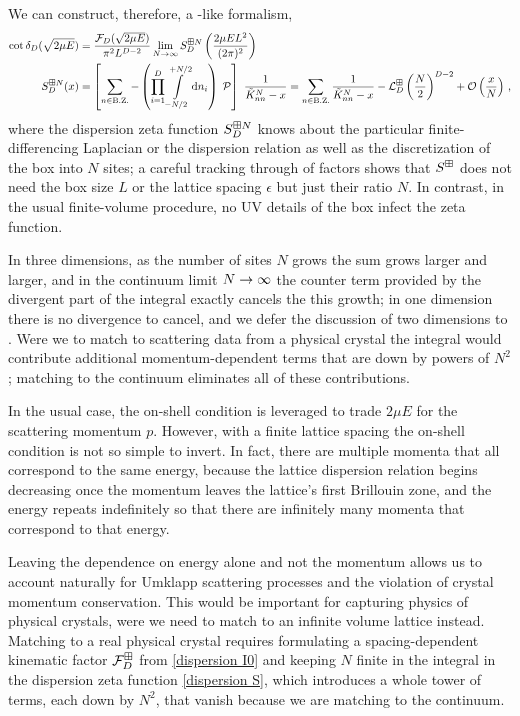 We can construct, therefore, a \Luscher-like formalism,
\begin{align}
    \label{eq:dispersion quantization}
    \cot \delta_D( \sqrt{2 \mu E} )
    &=
    \frac{\mathcal{F}_D(\sqrt{2 \mu E})}{\pi^2 L^{D-2}} \lim_{N\rightarrow\infty} S^{\boxplus N}_{D}\left(\frac{2\mu E L^2}{(2\pi)^2}\right)
    \\
    \label{eq:dispersion S}
    S^{\boxplus N}_{D}( x )
    &=
    \left[
    	\sum_{n\in\text{B.Z.}} -
		\left(\prod_{i=1}^D
    		\int\limits_{-N/2}^{+N/2}
    		\mathrm{d} n_i
    	\right)\; \mathcal{P} 
	\right]\  
	\frac{1}{ \tilde K_{nn}^{N} - x} = \sum_{n\in\text{B.Z.}}\frac{1}{ \tilde K_{nn}^{N} - x} - \mathcal{L}_D^{\boxplus}\left(\frac{N}{2}\right)^{D-2}
	+ \mathcal O\left(\frac{x}{N}\right) \, ,
\end{align}
where the dispersion zeta function $S^{\boxplus N}_{D}$ knows about the particular finite-differencing Laplacian or the dispersion relation as well as the discretization of the box into $N$ sites; a careful tracking through of factors shows that $S^{\boxplus}$ does not need the box size $L$ or the lattice spacing $\epsilon$ but just their ratio $N$.
In contrast, in the usual finite-volume procedure, no UV details of the box infect the zeta function.

In three dimensions, as the number of sites $N$ grows the sum grows larger and larger, and in the continuum limit $N\rightarrow\infty$ the counter term provided by the divergent part of the integral exactly cancels the this growth; in one dimension there is no divergence to cancel, and we defer the discussion of two dimensions to .
Were we to match to scattering data from a physical crystal the integral would contribute additional momentum-dependent terms that are down by powers of $N^2$; matching to the continuum eliminates all of these contributions.

In the usual case, the on-shell condition is leveraged to trade $2\mu E$ for the scattering momentum $p$.
However, with a finite lattice spacing the on-shell condition is not so simple to invert.
In fact, there are multiple momenta that all correspond to the same energy, because the lattice dispersion relation begins decreasing once the momentum leaves the lattice's first Brillouin zone, and the energy repeats indefinitely so that there are infinitely many momenta that correspond to that energy.

Leaving the dependence on energy alone and not the momentum allows us to account naturally for Umklapp scattering processes and the violation of crystal momentum conservation.
This would be important for capturing physics of physical crystals, were we need to match to an infinite volume lattice instead.
Matching to a real physical crystal requires formulating a spacing-dependent kinematic factor $\mathcal{F}_D^\boxplus$ from \eqref{dispersion I0} and keeping $N$ finite in the integral in the dispersion zeta function \eqref{dispersion S}, which introduces a whole tower of terms, each down by $N^2$, that vanish because we are matching to the continuum.

